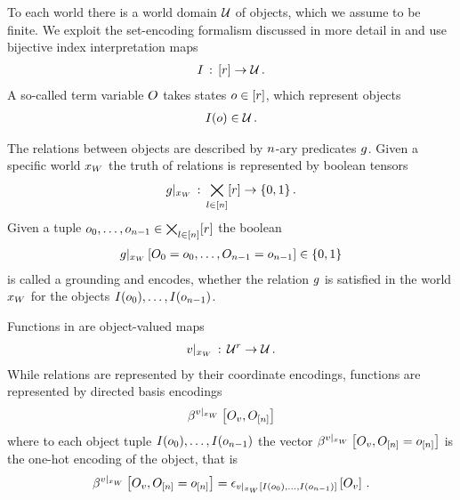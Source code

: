 To each world there is a world domain $\mathcal{U}$ of objects, which we assume to be finite.
We exploit the set-encoding formalism discussed in more detail in  and use bijective index interpretation maps
\begin{align*}
    I \,:\, [r] \rightarrow \mathcal{U} \, .
\end{align*}
A so-called term variable $O$ takes states $o\in[r]$, which represent objects
\begin{align*}
    I(o) \in \mathcal{U} \, .
\end{align*}

The relations between objects are described by $n$-ary predicates $g$.
Given a specific world $x_{W}$ the truth of relations is represented by boolean tensors
\begin{align*}
    {g}|_{x_{W}} \,:\, \bigtimes_{l\in[n]}[r]\rightarrow\{0,1\} \, .
\end{align*}
Given a tuple $o_{0},\ldots,o_{n-1}\in\bigtimes_{l\in[n]}[r]$ the boolean
\begin{align*}
    {g}|_{x_{W}} \left[O_{0}=o_{0},\ldots,O_{n-1}=o_{n-1}\right] \in\{0,1\}
\end{align*}
is called a grounding and encodes, whether the relation $g$ is satisfied in the world $x_{W}$ for the objects $I(o_{0}),\ldots,I(o_{n-1})$.

Functions in \firstOrderLogic{} are object-valued maps
\begin{align*}
    {v}|_{x_{W}}\,:\, \mathcal{U}^{r} \rightarrow \mathcal{U} \, .
\end{align*}
While relations are represented by their coordinate encodings, functions are represented by directed basis encodings
\begin{align*}
    \beta^{{v}|_{x_{W}}}\left[O_{v},O_{[n]}\right]
\end{align*}
where to each object tuple $I(o_{0}),\ldots,I(o_{n-1})$ the vector $\beta^{{v}|_{x_{W}}}\left[O_{v},O_{[n]}=o_{[n]}\right]$ is the one-hot encoding of the object, that is
\begin{align*}
    \beta^{{v}|_{x_{W}}}\left[O_{v},O_{[n]}=o_{[n]}\right]
    = \epsilon_{{v}|_{x_{W}} \left[I(o_{0}),\ldots,I(o_{n-1})\right]}\left[O_{v}\right] \, .
\end{align*}


